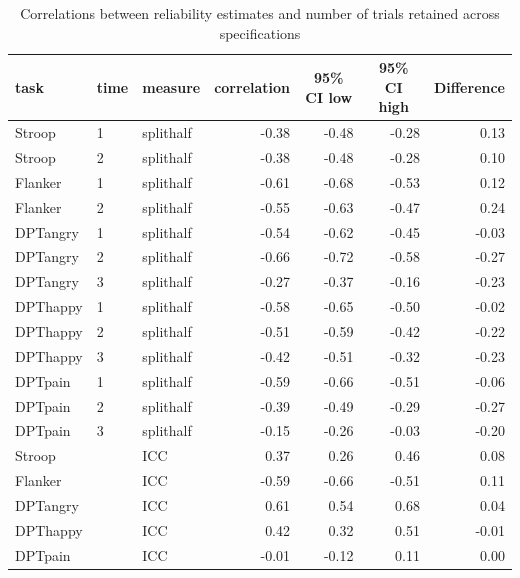 \documentclass[
  man,floatsintext]{apa6}
\begin{document}
\begin{table}[tbp]

\begin{center}
\begin{threeparttable}

\caption{\label{tab:tableone}Correlations between reliability estimates and number of trials retained across specifications}

\begin{tabular}{lllrrrr}
\toprule
task & \multicolumn{1}{c}{time} & \multicolumn{1}{c}{measure} & \multicolumn{1}{c}{correlation} & \multicolumn{1}{c}{95\% CI low} & \multicolumn{1}{c}{95\% CI high} & \multicolumn{1}{c}{Difference}\\
\midrule
Stroop & 1 & splithalf & -0.38 & -0.48 & -0.28 & 0.13\\
Stroop & 2 & splithalf & -0.38 & -0.48 & -0.28 & 0.10\\
Flanker & 1 & splithalf & -0.61 & -0.68 & -0.53 & 0.12\\
Flanker & 2 & splithalf & -0.55 & -0.63 & -0.47 & 0.24\\
DPTangry & 1 & splithalf & -0.54 & -0.62 & -0.45 & -0.03\\
DPTangry & 2 & splithalf & -0.66 & -0.72 & -0.58 & -0.27\\
DPTangry & 3 & splithalf & -0.27 & -0.37 & -0.16 & -0.23\\
DPThappy & 1 & splithalf & -0.58 & -0.65 & -0.50 & -0.02\\
DPThappy & 2 & splithalf & -0.51 & -0.59 & -0.42 & -0.22\\
DPThappy & 3 & splithalf & -0.42 & -0.51 & -0.32 & -0.23\\
DPTpain & 1 & splithalf & -0.59 & -0.66 & -0.51 & -0.06\\
DPTpain & 2 & splithalf & -0.39 & -0.49 & -0.29 & -0.27\\
DPTpain & 3 & splithalf & -0.15 & -0.26 & -0.03 & -0.20\\
Stroop &  & ICC & 0.37 & 0.26 & 0.46 & 0.08\\
Flanker &  & ICC & -0.59 & -0.66 & -0.51 & 0.11\\
DPTangry &  & ICC & 0.61 & 0.54 & 0.68 & 0.04\\
DPThappy &  & ICC & 0.42 & 0.32 & 0.51 & -0.01\\
DPTpain &  & ICC & -0.01 & -0.12 & 0.11 & 0.00\\
\bottomrule
\end{tabular}

\end{threeparttable}
\end{center}

\end{table}
\end{document}
